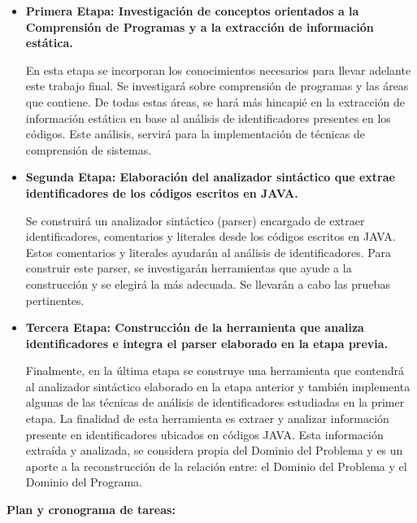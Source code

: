 \documentclass[a4paper,12pt]{report}
\begin{document}
\begin{itemize}
\renewcommand{\labelitemi}{$\circ$}%

\item \textbf{Primera Etapa: Investigación de conceptos orientados a la Comprensión de Programas y a la extracción de información estática.}

\hspace{0.5cm}En esta etapa se incorporan los conocimientos necesarios para llevar adelante este trabajo final. Se investigará sobre comprensión de programas y las áreas que contiene. De todas estas áreas, se hará más hincapié en la extracción de información estática en base al análisis de identificadores presentes en los códigos. Este análisis, servirá para la implementación de técnicas de comprensión de sistemas.

\item \textbf{Segunda Etapa: Elaboración del analizador sintáctico que extrae\\identificadores de los códigos escritos en JAVA.}

\hspace{0.5cm}Se construirá un analizador sintáctico (parser) encargado de extraer identificadores, comentarios y literales desde los códigos escritos en JAVA. Estos comentarios y literales ayudarán al análisis de identificadores. Para construir este parser, se investigarán herramientas que ayude a la construcción y se elegirá la más adecuada. Se llevarán a cabo las pruebas pertinentes.

\vskip0.5cm
\item \textbf{Tercera Etapa: Construcción de la herramienta que analiza\\identificadores e integra el parser elaborado en la etapa previa.}

\hspace{0.5cm}Finalmente, en la última etapa se construye una herramienta que contendrá al analizador sintáctico elaborado en la etapa anterior y también implementa algunas de las técnicas de análisis de identificadores estudiadas en la primer etapa. La finalidad de esta herramienta es extraer y analizar información presente en identificadores ubicados en códigos JAVA. Esta información extraída y analizada, se considera propia del Dominio del Problema y es un aporte a la reconstrucción de la relación entre: el Dominio del Problema y el Dominio del Programa.

\end{itemize}
\pagebreak
{\Large \textbf{Plan y cronograma de tareas:}}
\end{document}
